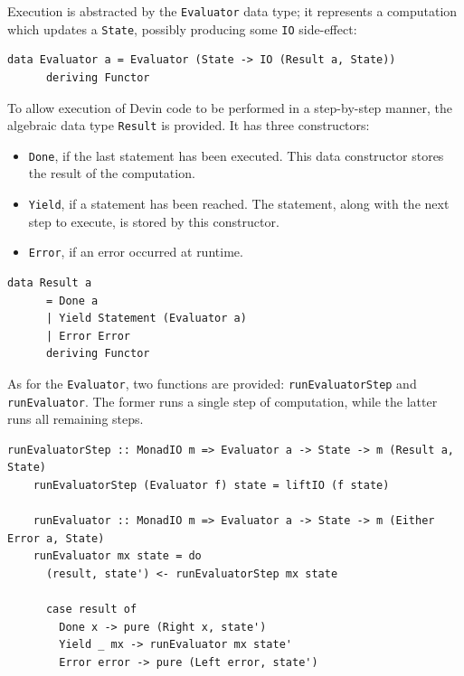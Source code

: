 \documentclass[UdineBachThesis,american,11pt]{PhdThesis}
\begin{document}
  \pagebreak

  Execution is abstracted by the \mbox{\texttt{Evaluator}} data type; it
  represents a computation which updates a \mbox{\texttt{State}}, possibly
  producing some \mbox{\texttt{IO}} side-effect:

  \begin{Verbatim}[gobble=4,fontsize=\small]
    data Evaluator a = Evaluator (State -> IO (Result a, State))
      deriving Functor
  \end{Verbatim}

  To allow execution of Devin code to be performed in a step-by-step manner, the
  algebraic data type \mbox{\texttt{Result}} is provided. It has three
  constructors:

  \begin{itemize}
    \item \mbox{\texttt{Done}}, if the last statement has been executed. This
    data constructor stores the result of the computation.

    \item \mbox{\texttt{Yield}}, if a statement has been reached. The statement,
    along with the next step to execute, is stored by this constructor.

    \item \mbox{\texttt{Error}}, if an error occurred at runtime.
  \end{itemize}

  \begin{Verbatim}[gobble=4,fontsize=\small]
    data Result a
      = Done a
      | Yield Statement (Evaluator a)
      | Error Error
      deriving Functor
  \end{Verbatim}

  As for the \mbox{\texttt{Evaluator}}, two functions are provided:
  \mbox{\texttt{runEvaluatorStep}} and \mbox{\texttt{runEvaluator}}. The former
  runs a single step of computation, while the latter runs all remaining steps.

  \begin{Verbatim}[gobble=4,fontsize=\small]
    runEvaluatorStep :: MonadIO m => Evaluator a -> State -> m (Result a, State)
    runEvaluatorStep (Evaluator f) state = liftIO (f state)

    runEvaluator :: MonadIO m => Evaluator a -> State -> m (Either Error a, State)
    runEvaluator mx state = do
      (result, state') <- runEvaluatorStep mx state

      case result of
        Done x -> pure (Right x, state')
        Yield _ mx -> runEvaluator mx state'
        Error error -> pure (Left error, state')
  \end{Verbatim}
\end{document}
